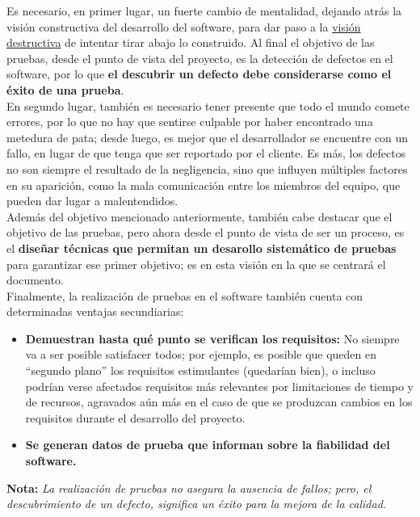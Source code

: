 Es necesario, en primer lugar, un fuerte cambio de mentalidad, dejando atrás la visión constructiva del desarrollo del software, para dar paso a la \uline{visión destructiva} de intentar tirar abajo lo construido. Al final el objetivo de las pruebas, desde el punto de vista del proyecto, es la detección de defectos en el software, por lo que \textbf{el descubrir un defecto debe considerarse como el éxito de una prueba}.\\

En segundo lugar, también es necesario tener presente que todo el mundo comete errores, por lo que no hay que sentirse culpable por haber encontrado una metedura de pata; desde luego, es mejor que el desarrollador se encuentre con un fallo, en lugar de que tenga que ser reportado por el cliente. Es más, los defectos no son siempre el resultado de la negligencia, sino que influyen múltiples factores en su aparición, como la mala comunicación entre los miembros del equipo, que pueden dar lugar a malentendidos.\\

Además del objetivo mencionado anteriormente, también cabe destacar que el objetivo de las pruebas, pero ahora desde el punto de vista de ser un proceso, es el \textbf{diseñar técnicas que permitan un desarollo sistemático de pruebas} para garantizar ese primer objetivo; es en esta visión en la que se centrará el documento.\\

Finalmente, la realización de pruebas en el software también cuenta con determinadas ventajas secundiarias:

\begin{itemize}
    \item \textbf{Demuestran hasta qué punto se verifican los requisitos:} No siempre va a ser posible satisfacer todos; por ejemplo, es posible que queden en ``segundo plano'' los requisitos estimulantes (quedarían bien), o incluso podrían verse afectados requisitos más relevantes por limitaciones de tiempo y de recursos, agravados aún más en el caso de que se produzcan cambios en los requisitos durante el desarrollo del proyecto.
    \item \textbf{Se generan datos de prueba que informan sobre la fiabilidad del software.}
\end{itemize}

\textbf{Nota:} \textit{La realización de pruebas no asegura la ausencia de fallos; pero, el descubrimiento de un defecto, significa un éxito para la mejora de la calidad.}\\

